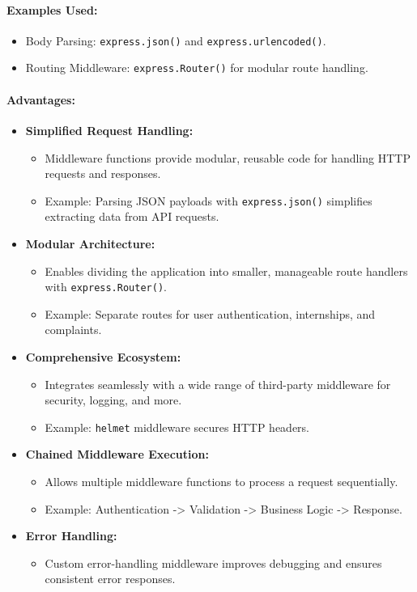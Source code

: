 \paragraph{Examples Used:}
\begin{itemize}
    \item Body Parsing: \texttt{express.json()} and \texttt{express.urlencoded()}.
    \item Routing Middleware: \texttt{express.Router()} for modular route handling.
\end{itemize}

\paragraph{Advantages:}
\begin{itemize}
    \item \textbf{Simplified Request Handling:}
    \begin{itemize}
        \item Middleware functions provide modular, reusable code for handling HTTP requests and responses.
        \item Example: Parsing JSON payloads with \texttt{express.json()} simplifies extracting data from API requests.
    \end{itemize}
    \item \textbf{Modular Architecture:}
    \begin{itemize}
        \item Enables dividing the application into smaller, manageable route handlers with \texttt{express.Router()}.
        \item Example: Separate routes for user authentication, internships, and complaints.
    \end{itemize}
    \item \textbf{Comprehensive Ecosystem:}
    \begin{itemize}
        \item Integrates seamlessly with a wide range of third-party middleware for security, logging, and more.
        \item Example: \texttt{helmet} middleware secures HTTP headers.
    \end{itemize}
    \item \textbf{Chained Middleware Execution:}
    \begin{itemize}
        \item Allows multiple middleware functions to process a request sequentially.
        \item Example: Authentication -> Validation -> Business Logic -> Response.
    \end{itemize}
    \item \textbf{Error Handling:}
    \begin{itemize}
        \item Custom error-handling middleware improves debugging and ensures consistent error responses.
    \end{itemize}
\end{itemize}

